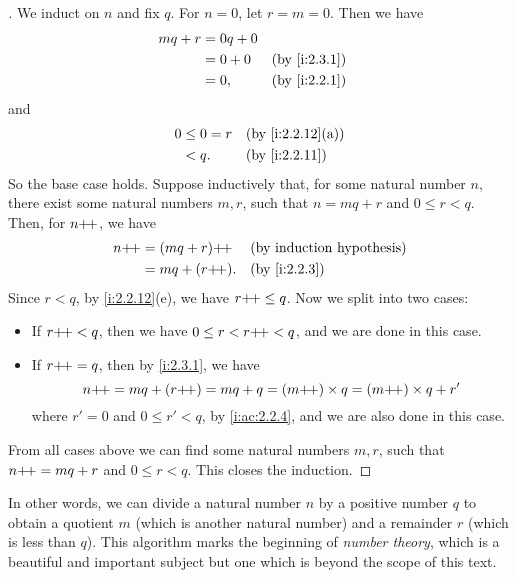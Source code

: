 \begin{proof}[]
  We induct on \(n\) and fix \(q\).
  For \(n = 0\), let \(r = m = 0\).
  Then we have
  \begin{align*}
    mq + r & = 0q + 0                   \\
           & = 0 + 0  &  & \by{i:2.3.1} \\
           & = 0,     &  & \by{i:2.2.1}
  \end{align*}
  and
  \begin{align*}
    0 & \leq 0 = r &  & \by{i:2.2.12}[a] \\
      & < q.       &  & \by{i:2.2.11}
  \end{align*}
  So the base case holds.
  Suppose inductively that, for some natural number \(n\), there exist some natural numbers \(m, r\), such that \(n = mq + r\) and \(0 \leq r < q\).
  Then, for \(n{+}\!{+}\), we have
  \begin{align*}
    n\pp & = (mq + r)\pp  &  & \byIH        \\
         & = mq + (r\pp). &  & \by{i:2.2.3} \\
  \end{align*}
  Since \(r < q\), by \cref{i:2.2.12}(e), we have \(r{+}\!{+} \leq q\).
  Now we split into two cases:
  \begin{itemize}
    \item If \(r{+}\!{+} < q\), then we have \(0 \leq r < r{+}\!{+} < q\), and we are done in this case.
    \item If \(r{+}\!{+} = q\), then by \cref{i:2.3.1}, we have
          \[
            n{+}\!{+} = mq + (r{+}\!{+}) = mq + q = (m{+}\!{+}) \times q = (m{+}\!{+}) \times q + r'
          \]
          where \(r' = 0\) and \(0 \leq r' < q\), by \cref{i:ac:2.2.4}, and we are also done in this case.
  \end{itemize}
  From all cases above we can find some natural numbers \(m, r\), such that \(n{+}\!{+} = mq + r\) and \(0 \leq r < q\).
  This closes the induction.
\end{proof}

\begin{rmk}\label{i:2.3.10}
  In other words, we can divide a natural number \(n\) by a positive number \(q\) to obtain a quotient \(m\) (which is another natural number) and a remainder \(r\) (which is less than \(q\)).
  This algorithm marks the beginning of \emph{number theory}, which is a beautiful and important subject but one which is beyond the scope of this text.
\end{rmk}

